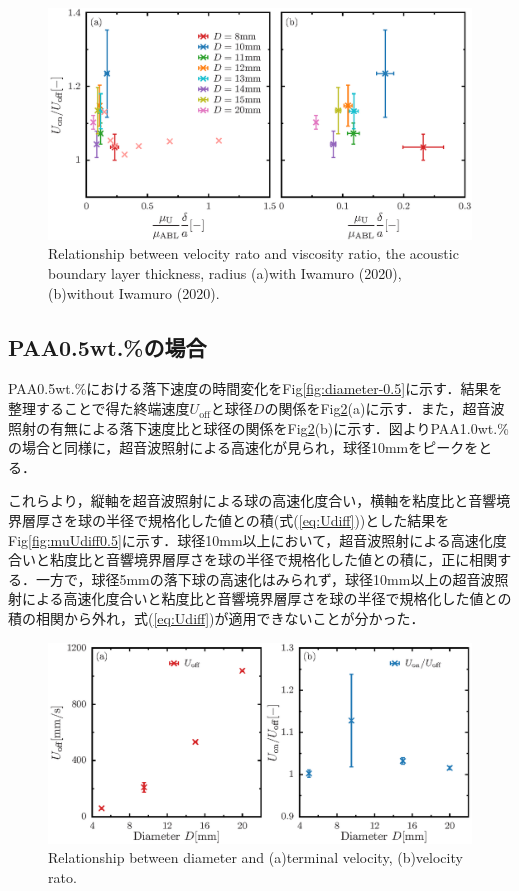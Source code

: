 \begin{figure}[ht]
    \centering
    \includegraphics[width=1\textwidth]{./5-Results/mu_Udiff.eps}
    \caption{Relationship between velocity rato and viscosity ratio, the acoustic boundary layer thickness, radius (a)with Iwamuro (2020), (b)without Iwamuro (2020).}
    \label{fig:muUdiff}
\end{figure}

\newpage

\subsection{PAA0.5wt.\%の場合}
PAA0.5wt.\%における落下速度の時間変化をFig\ref{fig:diameter-0.5}に示す．結果を整理することで得た終端速度$U_\text{off}$と球径$D$の関係をFig\ref{fig:diaUT0.5}(a)に示す．また，超音波照射の有無による落下速度比と球径の関係をFig\ref{fig:diaUT0.5}(b)に示す．図よりPAA1.0wt.\%の場合と同様に，超音波照射による高速化が見られ，球径10mmをピークをとる．

これらより，縦軸を超音波照射による球の高速化度合い，横軸を粘度比と音響境界層厚さを球の半径で規格化した値との積(式(\ref{eq:Udiff}))とした結果をFig\ref{fig:muUdiff0.5}に示す．球径10mm以上において，超音波照射による高速化度合いと粘度比と音響境界層厚さを球の半径で規格化した値との積に，正に相関する．一方で，球径5mmの落下球の高速化はみられず，球径10mm以上の超音波照射による高速化度合いと粘度比と音響境界層厚さを球の半径で規格化した値との積の相関から外れ，式(\ref{eq:Udiff})が適用できないことが分かった．
\begin{figure}[ht]
    \centering
    \includegraphics[width=1\textwidth]{./5-Results/diameter-0.5/diaUT_Udiff.eps}
    \caption{Relationship between diameter and (a)terminal velocity, (b)velocity rato.}
    \label{fig:diaUT0.5}
\end{figure}

